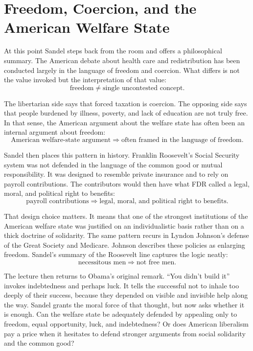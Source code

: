 \section{Freedom, Coercion, and the American Welfare State}

At this point Sandel steps back from the room and offers a philosophical summary. The American debate about health care and redistribution has been conducted largely in the language of freedom and coercion. What differs is not the value invoked but the interpretation of that value:
\begin{equation}
\text{freedom}
\neq
\text{single uncontested concept}.
\end{equation}

The libertarian side says that forced taxation is coercion. The opposing side says that people burdened by illness, poverty, and lack of education are not truly free. In that sense, the American argument about the welfare state has often been an internal argument about freedom:
\begin{equation}
\text{American welfare-state argument}
\Longrightarrow
\text{often framed in the language of freedom}.
\end{equation}

Sandel then places this pattern in history. Franklin Roosevelt's Social Security system was not defended in the language of the common good or mutual responsibility. It was designed to resemble private insurance and to rely on payroll contributions. The contributors would then have what FDR called a legal, moral, and political right to benefits:
\begin{equation}
\text{payroll contributions}
\Longrightarrow
\text{legal, moral, and political right to benefits}.
\end{equation}

That design choice matters. It means that one of the strongest institutions of the American welfare state was justified on an individualistic basis rather than on a thick doctrine of solidarity. The same pattern recurs in Lyndon Johnson's defense of the Great Society and Medicare. Johnson describes these policies as enlarging freedom. Sandel's summary of the Roosevelt line captures the logic neatly:
\begin{equation}
\text{necessitous men}
\Longrightarrow
\text{not free men}.
\end{equation}

The lecture then returns to Obama's original remark. ``You didn't build it'' invokes indebtedness and perhaps luck. It tells the successful not to inhale too deeply of their success, because they depended on visible and invisible help along the way. Sandel grants the moral force of that thought, but now asks whether it is enough. Can the welfare state be adequately defended by appealing only to freedom, equal opportunity, luck, and indebtedness? Or does American liberalism pay a price when it hesitates to defend stronger arguments from social solidarity and the common good?

